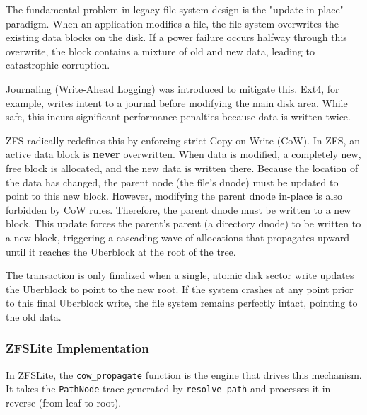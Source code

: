 \documentclass[pdflatex,sn-mathphys-num]{sn-jnl}
\begin{document}
The fundamental problem in legacy file system design is the "update-in-place" paradigm. When an application modifies a file, the file system overwrites the existing data blocks on the disk. If a power failure occurs halfway through this overwrite, the block contains a mixture of old and new data, leading to catastrophic corruption. 

Journaling (Write-Ahead Logging) was introduced to mitigate this. Ext4, for example, writes intent to a journal before modifying the main disk area. While safe, this incurs significant performance penalties because data is written twice.

ZFS radically redefines this by enforcing strict Copy-on-Write (CoW). In ZFS, an active data block is \textbf{never} overwritten. When data is modified, a completely new, free block is allocated, and the new data is written there. Because the location of the data has changed, the parent node (the file's dnode) must be updated to point to this new block. However, modifying the parent dnode in-place is also forbidden by CoW rules. Therefore, the parent dnode must be written to a new block. This update forces the parent's parent (a directory dnode) to be written to a new block, triggering a cascading wave of allocations that propagates upward until it reaches the Uberblock at the root of the tree. 

The transaction is only finalized when a single, atomic disk sector write updates the Uberblock to point to the new root. If the system crashes at any point prior to this final Uberblock write, the file system remains perfectly intact, pointing to the old data.

\subsubsection{ZFSLite Implementation}

In ZFSLite, the \verb+cow_propagate+ function is the engine that drives this mechanism. It takes the \verb+PathNode+ trace generated by \verb+resolve_path+ and processes it in reverse (from leaf to root).
\end{document}

